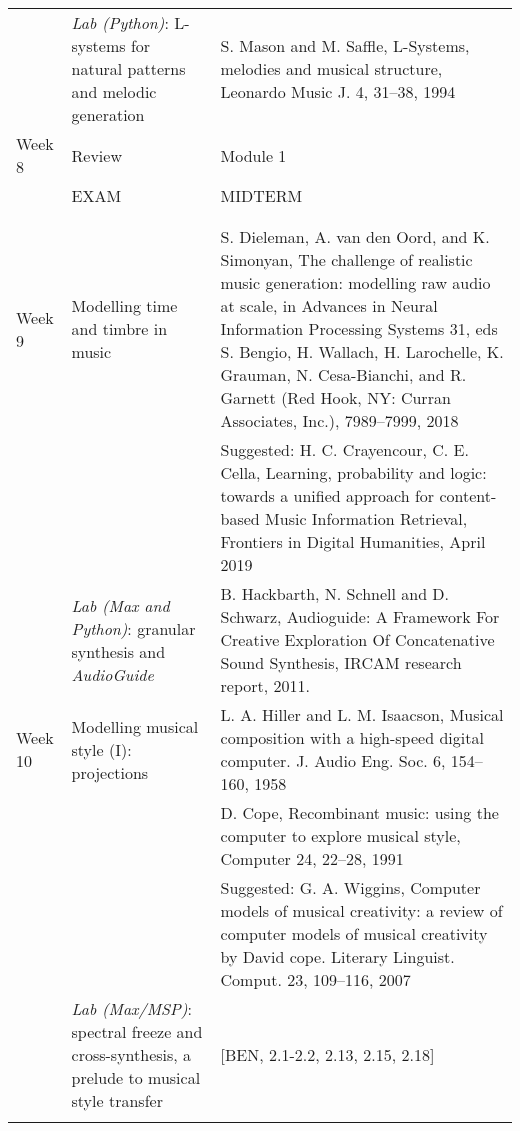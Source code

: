\documentclass[letterpaper]{inzane_syllabus} %
\begin{document}
\begin{center}
\begin{tabularx}{\textwidth}{p{2cm}p{8cm} @{\hskip 0.5cm} p{9.5cm}}
&  \emph{Lab (Python)}: L-systems for natural patterns and melodic generation &  S. Mason and M. Saffle, L-Systems, melodies and musical structure, Leonardo Music J. 4, 31–38, 1994 \\
\arrayrulecolor{maingray}\hline

 Week 8 & Review & Module 1 \\
 &EXAM &  MIDTERM \\
& & \\ 
 \arrayrulecolor{myCOLOR}\hline
\multicolumn{2}{l}{\textbf{\textcolor{myCOLOR}{\large MODULE 2: Transformations }}} \\
\hline

Week 9 & Modelling time and timbre in music & S. Dieleman, A.  van den Oord,  and K. Simonyan, The challenge of realistic music generation: modelling raw audio at scale, in Advances in Neural Information Processing Systems 31, eds S. Bengio, H. Wallach, H. Larochelle, K. Grauman, N. Cesa-Bianchi, and R. Garnett (Red Hook, NY: Curran Associates,
Inc.), 7989–7999, 2018 \\
& &  Suggested: H. C. Crayencour, C. E. Cella, Learning, probability and logic: towards a unified approach for content-based Music Information Retrieval, Frontiers in Digital Humanities, April 2019 \\

& \emph{Lab (Max and Python)}: granular synthesis and \emph{AudioGuide} & B. Hackbarth, N. Schnell and D. Schwarz, Audioguide: A Framework For Creative Exploration Of Concatenative Sound Synthesis, IRCAM research report, 2011. \\

\arrayrulecolor{maingray}\hline

Week 10 & Modelling musical style (I): projections & L. A. Hiller and L. M. Isaacson, Musical composition with a high-speed
digital computer. J. Audio Eng. Soc. 6, 154–160, 1958 \\
& & D. Cope, Recombinant music: using the computer to explore musical style, Computer 24, 22–28, 1991 \\
& &  Suggested: G. A. Wiggins, Computer models of musical creativity: a review of computer models of musical creativity by David cope. Literary Linguist. Comput. 23, 109–116, 2007 \\

&   \emph{Lab (Max/MSP)}: spectral freeze and cross-synthesis, a prelude to musical style transfer & [BEN, 2.1-2.2, 2.13, 2.15, 2.18] \\
\arrayrulecolor{maingray}\hline


\end{tabularx}
\end{center}
\end{document}
